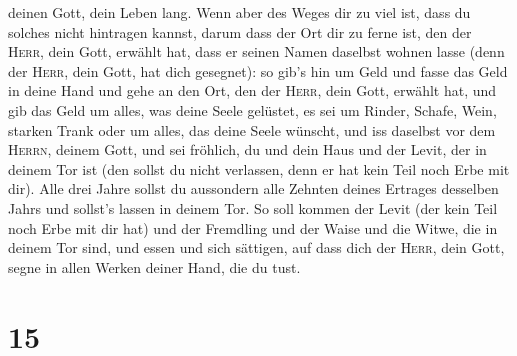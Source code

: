 deinen Gott, dein Leben lang.  Wenn aber des Weges dir zu
viel ist, dass du solches nicht hintragen kannst, darum dass der Ort dir
zu ferne ist, den der \textsc{Herr}, dein Gott, erwählt hat, dass er
seinen Namen daselbst wohnen lasse (denn der \textsc{Herr}, dein Gott,
hat dich gesegnet):  so gib's hin um Geld und fasse das
Geld in deine Hand und gehe an den Ort, den der \textsc{Herr}, dein
Gott, erwählt hat,  und gib das Geld um alles, was deine
Seele gelüstet, es sei um Rinder, Schafe, Wein, starken Trank oder um
alles, das deine Seele wünscht, und iss daselbst vor dem \textsc{Herrn},
deinem Gott, und sei fröhlich, du und dein Haus  und der
Levit, der in deinem Tor ist (den sollst du nicht verlassen, denn er hat
kein Teil noch Erbe mit dir).  Alle drei Jahre sollst du
aussondern alle Zehnten deines Ertrages desselben Jahrs und sollst's
lassen in deinem Tor.  So soll kommen der Levit (der kein
Teil noch Erbe mit dir hat) und der Fremdling und der Waise und die
Witwe, die in deinem Tor sind, und essen und sich sättigen, auf dass
dich der \textsc{Herr}, dein Gott, segne in allen Werken deiner Hand,
die du tust.

\hypertarget{section-14}{%
\section{15}\label{section-14}}

